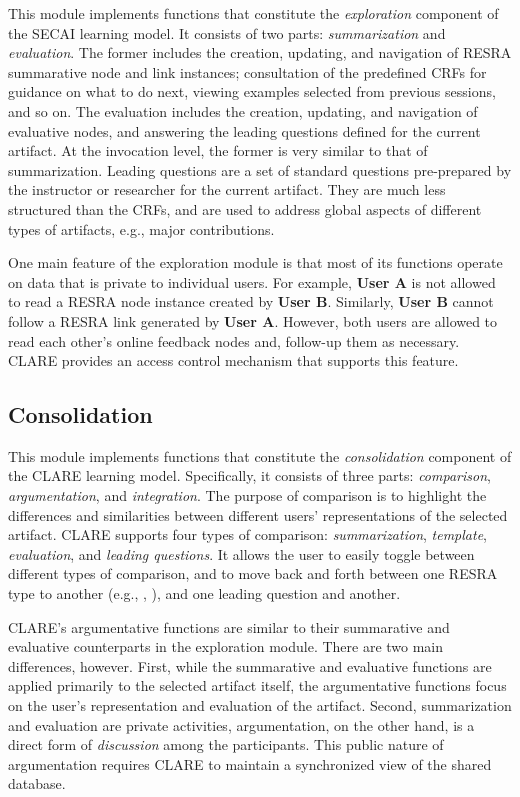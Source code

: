 This module implements functions that constitute the {\it exploration\/}
component of the SECAI learning model. It consists of two parts: {\it
summarization\/} and {\it evaluation\/}. The former includes the creation,
updating, and navigation of RESRA summarative node and link instances;
consultation of the predefined CRFs for guidance on what to do next,
viewing examples selected from previous sessions, and so on.  The
evaluation includes the creation, updating, and navigation of evaluative
nodes, and answering the leading questions defined for the current
artifact. At the invocation level, the former is very similar to that of
summarization. Leading questions are a set of standard questions
pre-prepared by the instructor or researcher for the current artifact. They
are much less structured than the CRFs, and are used to address global
aspects of different types of artifacts, e.g., major contributions.

One main feature of the exploration module is that most of its functions
operate on data that is private to individual users. For example, {\bf User
A} is not allowed to read a RESRA node instance created by {\bf User B}.
Similarly, {\bf User B} cannot follow a RESRA link generated by {\bf User
A}. However, both users are allowed to read each other's online feedback
nodes and, follow-up them as necessary. CLARE provides an access control
mechanism that supports this feature.


\subsection{Consolidation}
\label{sec:consolidation}

This module implements functions that constitute the {\it consolidation\/}
component of the CLARE learning model. Specifically, it consists of three
parts: {\it comparison\/}, {\it argumentation\/}, and {\it integration\/}.
The purpose of comparison is to highlight the differences and similarities
between different users' representations of the selected artifact. CLARE
supports four types of comparison: {\it summarization\/}, {\it template\/},
{\it evaluation\/}, and {\it leading questions\/}. It allows the user to
easily toggle between different types of comparison, and to move back and
forth between one RESRA type to another (e.g., ,
), and one leading question and another.

CLARE's argumentative functions are similar to their summarative and
evaluative counterparts in the exploration module. There are two main
differences, however. First, while the summarative and evaluative functions
are applied primarily to the selected artifact itself, the argumentative
functions focus on the user's representation and evaluation of the
artifact. Second, summarization and evaluation are private activities,
argumentation, on the other hand, is a direct form of {\it discussion\/} among
the participants. This public nature of argumentation requires CLARE to
maintain a synchronized view of the shared database.

